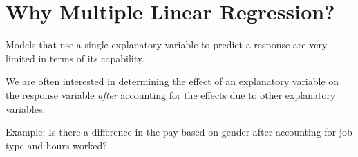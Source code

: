 \documentclass[12pt]{notes}
\begin{document}

\section{Why Multiple Linear Regression?}
\bi
\item Models that use a single explanatory variable to predict a response are very limited in terms of its capability. 
\item We are often interested in determining the effect of an explanatory variable on the response variable \textit{after} accounting for the effects due to other explanatory variables. 
\bi
\item Example: Is there a difference in the pay based on gender after accounting for job type and hours worked? 
\ei
\ei

\nspace
{}

\begin{minipage}[l][3cm][c]{\textwidth}
\end{minipage}
\end{document}
